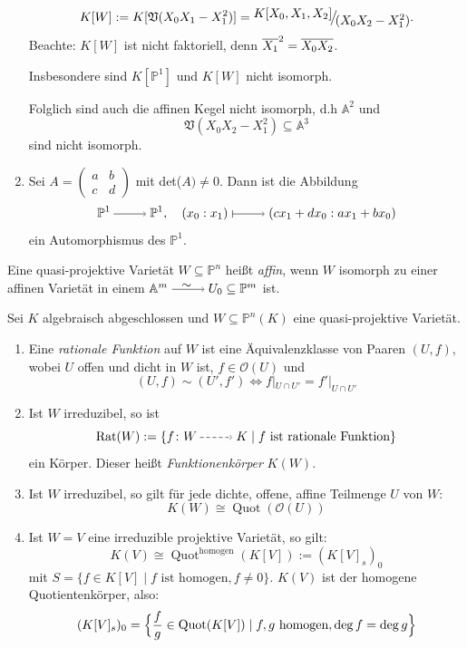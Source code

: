 \documentclass[a4paper,12pt]{scrbook}
\theoremstyle{keinenummern} %
\theoremstyle{mitnummern}
\theoremstyle{unserbeweis}
\def\A{\mathbb{A}}
\def\V{\mathfrak{V}}
\def\O{\mathcal{O}}
\def\P{\mathbb{P}}
\newcommand{\Rat}{\mathrm{Rat}}
\newcommand{\Quot}{\operatorname{Quot}}
\newcommand{\restrict}[1]{|_{#1}}
\newcommand{\ra}{\raisebox{-1pt}{\tikz{\draw[thin,shorten >=3pt, ->] (0,0) node{\hspace*{-2pt}} -- node{} (1,0);}}\penalty1000\relax}
\renewcommand{\mapsto}{\raisebox{-1pt}{\tikz{\draw[thin,shorten >=3pt, |->] (0,0) node{\hspace*{0pt}} -- node{} (1,0);}}\penalty1000\relax}
\newcommand{\isom}{\raisebox{-1pt}{\tikz{\draw[thin,shorten >=3pt, ->] (0,0) node{\hspace*{0pt}} -- node{} (1,0);\draw (0.4,0.1)
    node {$\sim$};}}\penalty1000\relax}
\newcommand{\ppf}{\raisebox{-1pt}{\tikz{\draw[densely dashed,thin,shorten >=3pt, ->] (0,0) node{\hspace*{-2pt}} -- node{} (1,0);}}\penalty1000\relax}
\def\Bar#1{\ensuremath\overline{#1}}
\newcommand{\Quotient}[2]{
  \mathchoice
  { %
    \raisebox{0.7ex}{\ensuremath{#1}}
    \ensuremath{\mkern-3mu}\big/\ensuremath{\mkern-3mu}
    \raisebox{-0.6ex}{\ensuremath{#2}}
  }
  { %
    #1/#2
  }
  { %
    #1/#2
  }
  { %
    #1/#2
  }
}
\begin{document}
\begin{bsp}
\begin{enumerate}
\[K[W]:=K[\V(X_0X_1-X_1^2)]=\Quotient{K[X_0,X_1,X_2]}{(X_0X_2-X_1^2)}.\]
Beachte: $K[W]$ ist nicht faktoriell, denn $\Bar{X_1}^2=\Bar{X_0X_2}$.

Insbesondere sind $K[\P^1]$ und $K[W]$ nicht isomorph.

Folglich sind auch die affinen Kegel nicht isomorph, d.h $\A^2$ und \[\V(X_0X_2-X_1^2)\subseteq \A^3\] sind nicht isomorph.
  \item{} Sei $A=\begin{pmatrix} a&b\\c&d \end{pmatrix}$ mit det($A)\neq 0$. Dann ist die Abbildung 
\[\P^1\ra \P^1, \quad (x_0:x_1)\mapsto (cx_1+dx_0:ax_1+bx_0)\]
ein Automorphismus des $\P^1$.
\end{enumerate}
\end{bsp}

\begin{dfn}\label{2.6.4}
Eine quasi-projektive Varietät $W\subseteq \P^n$ heißt \emph{affin}, wenn $W$ isomorph zu einer affinen Varietät in einem $\A^m \isom U_0\subseteq \P^m$ ist.
\end{dfn}

\begin{db}\label{2.6.5}
 Sei $K$ algebraisch abgeschlossen und $W\subseteq \P^n(K)$ eine quasi-projektive Varietät.
\begin{enumerate}
  \item{} Eine \emph{rationale Funktion} auf $W$ ist eine Äquivalenzklasse von Paaren $(U,f)$, wobei $U$ offen und dicht in $W$ ist, $f\in \O(U)$ und
  \[(U,f)\sim (U',f') \iff f\restrict{U\cap U'}=f'\restrict{U\cap U'}\]
  \item{} Ist $W$ irreduzibel, so ist 
  \[\Rat(W):=\{f\colon W \ppf K \mid f \text{ ist rationale Funktion}\}\]
  ein Körper. Dieser heißt \emph{Funktionenkörper} $K(W)$. 
  \item{} Ist $W$ irreduzibel, so gilt für jede dichte, offene, affine Teilmenge $U$ von $W$:
\[K(W)\cong \Quot(\O(U))\]
  \item{} Ist $W=V$ eine irreduzible projektive Varietät, so gilt:
\[K(V)\cong \Quot^{\mathrm{homogen}}(K[V]):=(K[V]_s)_0\] 
mit $S=\{f\in K[V] \mid f \text{ ist homogen}, f\neq 0 \}$. $K(V)$ ist der homogene Quotientenkörper, also:
\[(K[V]_s)_0=\Bigl\{\frac{f}{g} \in \Quot(K[V]) \mid f,g \text{ homogen}, \deg f=\deg g\Bigr\}\]
\end{enumerate}
\end{db}
\end{document}
